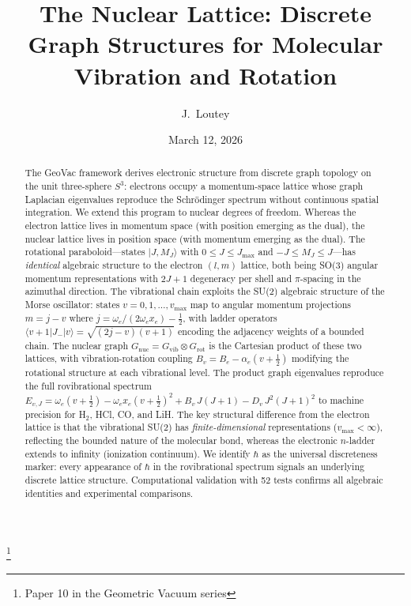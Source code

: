 \documentclass[aps,pra,twocolumn,superscriptaddress,longbibliography]{revtex4-2}
\begin{document}
\title{The Nuclear Lattice: Discrete Graph Structures for Molecular\\
Vibration and Rotation}
\thanks{Paper 10 in the Geometric Vacuum series}

\author{J.~Loutey}

\date{March 12, 2026}


\begin{abstract}
The GeoVac framework derives electronic structure from discrete graph
topology on the unit three-sphere $S^3$: electrons occupy a
momentum-space lattice whose graph Laplacian eigenvalues reproduce the
Schr\"odinger spectrum without continuous spatial integration.  We
extend this program to nuclear degrees of freedom.  Whereas the
electron lattice lives in momentum space (with position emerging as the
dual), the nuclear lattice lives in position space (with momentum
emerging as the dual).  The rotational paraboloid---states
$|J, M_J\rangle$ with $0 \leq J \leq J_{\max}$ and
$-J \leq M_J \leq J$---has \emph{identical} algebraic structure to the
electron $(l, m)$ lattice, both being SO(3) angular momentum
representations with $2J+1$ degeneracy per shell and $\pi$-spacing in
the azimuthal direction.  The vibrational chain exploits the SU(2)
algebraic structure of the Morse oscillator: states
$v = 0, 1, \ldots, v_{\max}$ map to angular momentum projections
$m = j - v$ where $j = \omega_e/(2\omega_e x_e) - \tfrac{1}{2}$, with
ladder operators
$\langle v{+}1|J_-|v\rangle = \sqrt{(2j-v)(v+1)}$ encoding the
adjacency weights of a bounded chain.  The nuclear graph
$G_{\mathrm{nuc}} = G_{\mathrm{vib}} \otimes G_{\mathrm{rot}}$ is the
Cartesian product of these two lattices, with vibration-rotation
coupling $B_v = B_e - \alpha_e(v+\tfrac{1}{2})$ modifying the
rotational structure at each vibrational level.  The product graph
eigenvalues reproduce the full rovibrational spectrum
$E_{v,J} = \omega_e(v+\tfrac{1}{2}) - \omega_e x_e(v+\tfrac{1}{2})^2
+ B_v\,J(J+1) - D_v\,J^2(J+1)^2$ to machine precision for H$_2$, HCl,
CO, and LiH.  The key structural difference from the electron lattice
is that the vibrational SU(2) has \emph{finite-dimensional}
representations ($v_{\max} < \infty$), reflecting the bounded nature of
the molecular bond, whereas the electronic $n$-ladder extends to
infinity (ionization continuum).  We identify $\hbar$ as the universal
discreteness marker: every appearance of $\hbar$ in the rovibrational
spectrum signals an underlying discrete lattice structure. Computational
validation with 52 tests confirms all algebraic identities and
experimental comparisons.
\end{abstract}
\end{document}
